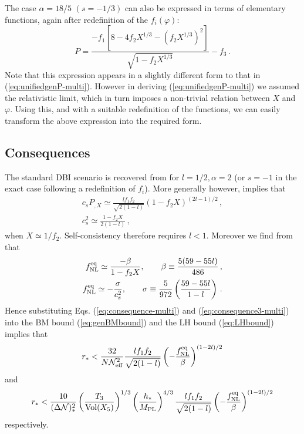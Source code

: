 The case $\alpha =18/5$ $(s=-1/3)$ can also be expressed in terms 
of elementary functions, again after redefinition of the $f_i (\varphi)$: 
% 
\begin{equation}
P = \frac{-f_1\left[8 - 4f_2X^{1/3}
-\left(f_2X^{1/3}\right)^2\right]}{\sqrt{1-f_2X^{1/3}}} -f_3 \, .
\end{equation}
% 
Note that this expression appears in a slightly different 
form to that in (\ref{eq:unifiedgenP-multi}). 
However in deriving (\ref{eq:unifiedgenP-multi}) we assumed the
relativistic limit, which in turn imposes a non-trivial 
relation between $X$ and $\varphi$. Using this, and with a 
suitable redefinition of the functions, we can
easily transform the above expression into the required form.


\subsection{Consequences}
\label{sec:consequences-multi}

The standard DBI scenario is recovered from  for
$l=1/2, \alpha = 2$ (or $s=-1$ in the exact case following a redefinition of
$f_i$). 
More generally however,  implies that  
% 
\begin{eqnarray}
\label{eq:consequence-multi}
c_sP_{,X} \simeq \frac{l f_1 f_2}{\sqrt{2(1-l)}} \left( 
1- f_2X \right)^{(2l-1)/2} \,,
\\
c_s^2 \simeq \frac{1-f_2X}{2(1-l)} \,,
\end{eqnarray}
% 
when $X \simeq 1/f_2$. Self-consistency therefore
requires $l<1$. Moreover
we find from  that
%  
\begin{eqnarray}
\label{eq:consequence3-multi}
f_{\mathrm{NL}}^{\mathrm{eq}} \simeq \frac{-\beta}{1-f_2X} , \qquad \beta \equiv \frac{5(59-55l)}{486}
\,,
\\
\label{eq:consequence4-multi}
f_{\mathrm{NL}}^{\mathrm{eq}} \simeq -\frac{\sigma}{c_s^2}, \qquad \sigma \equiv 
\frac{5}{972} \left( \frac{59-55l}{1-l} \right) \,.
\end{eqnarray}
% 
Hence substituting Eqs. (\ref{eq:consequence-multi}) and (\ref{eq:consequence3-multi}) 
into the BM bound (\ref{eq:genBMbound}) and the LH bound (\ref{eq:LHbound})
implies that
%  
\begin{equation}
\label{eq:weakBM-multi}
r_*< \frac{32}{N \mathcal{N}_\mathrm{eff}^2} \frac{l f_1 f_2}{\sqrt{2(1-l)}}
\left( -\frac{f_{\mathrm{NL}}^{\mathrm{eq}}}{\beta} \right)^{(1-2l)/2}
\end{equation}
% 
and
%  
\begin{equation}
\label{eq:weakLH-multi}
r_* < \frac{10}{(\Delta \mathcal{N})_*^2} \left( \frac{T_3}{\mathrm{Vol} (X_5)} \right)^{1/3} 
\left( \frac{h_*}{M_{\mathrm{PL}}} \right)^{4/3}
\frac{l f_1 f_2}{\sqrt{2(1-l)}}
\left( -\frac{f_{\mathrm{NL}}^{\mathrm{eq}}}{\beta} \right)^{(1-2l)/2}
\end{equation}
% 
respectively. 


